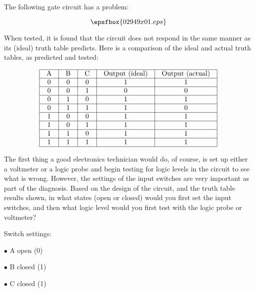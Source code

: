 

The following gate circuit has a problem:

$$\epsfbox{02949x01.eps}$$

When tested, it is found that the circuit does not respond in the same manner as its (ideal) truth table predicts.  Here is a comparison of the ideal and actual truth tables, as predicted and tested:


$$\vbox{\offinterlineskip
\halign{\strut
\vrule \quad\hfil # \ \hfil & 
\vrule \quad\hfil # \ \hfil & 
\vrule \quad\hfil # \ \hfil & 
\vrule \quad\hfil # \ \hfil & 
\vrule \quad\hfil # \ \hfil \vrule \cr
\noalign{\hrule}
%
A & B & C & Output (ideal) & Output (actual) \cr
%
\noalign{\hrule}
%
0 & 0 & 0 & 1 & 1 \cr
%
\noalign{\hrule}
%
0 & 0 & 1 & 0 & 0 \cr
%
\noalign{\hrule}
%
0 & 1 & 0 & 1 & 1 \cr
%
\noalign{\hrule}
%
0 & 1 & 1 & 1 & 0 \cr
%
\noalign{\hrule}
%
1 & 0 & 0 & 1 & 1 \cr
%
\noalign{\hrule}
%
1 & 0 & 1 & 1 & 1 \cr
%
\noalign{\hrule}
%
1 & 1 & 0 & 1 & 1 \cr
%
\noalign{\hrule}
%
1 & 1 & 1 & 1 & 1 \cr
%
\noalign{\hrule}
} %
}$$ %

The first thing a good electronics technician would do, of course, is set up either a voltmeter or a logic probe and begin testing for logic levels in the circuit to see what is wrong.  However, the settings of the input switches are very important as part of the diagnosis.  Based on the design of the circuit, and the truth table results shown, in what states (open or closed) would you first set the input switches, and then what logic level would you first test with the logic probe or voltmeter?







Switch settings:

\medskip
\item{$\bullet$} A open (0)
\item{$\bullet$} B closed (1)
\item{$\bullet$} C closed (1)
\medskip


